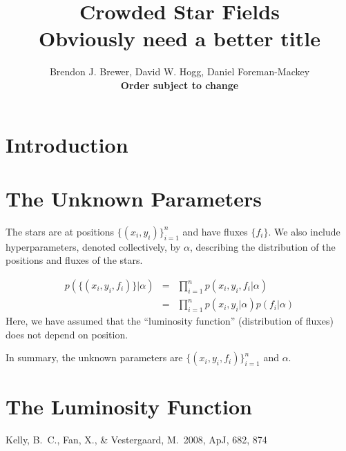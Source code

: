 \documentclass[letterpaper, 11pt]{article}
\title{Crowded Star Fields \\ \bf{Obviously need a better title}}
\author{Brendon J. Brewer, David W. Hogg, Daniel Foreman-Mackey \\ 
\bf{Order subject to change}}
\begin{document}
 \maketitle

\section{Introduction}

\section{The Unknown Parameters}
The stars are at positions $\{(x_i, 
y_i)\}_{i=1}^n$ and have fluxes $\{f_i\}$. We also include 
hyperparameters, denoted collectively, by $\alpha$, describing the 
distribution of the positions and fluxes of the stars.

\begin{eqnarray} 
p(\{(x_i, y_i, f_i)\} | \alpha) &=&
\prod_{i=1}^n p(x_i, y_i, f_i | \alpha) \\
&=& \prod_{i=1}^n p(x_i, y_i | \alpha)p(f_i | \alpha) 
\end{eqnarray}
Here, we have assumed that the ``luminosity function'' 
(distribution of fluxes) does not depend on position.

In summary, the unknown parameters are $\{(x_i, y_i, f_i)\}_{i=1}^n$
and $\alpha$.

\section{The Luminosity Function}
\citep{2008ApJ...682..874K}

\begin{thebibliography}{99}
 Kelly, B.~C., Fan, X., 
\& Vestergaard, M.\ 2008, ApJ, 682, 874 
\end{thebibliography}
\end{document}
